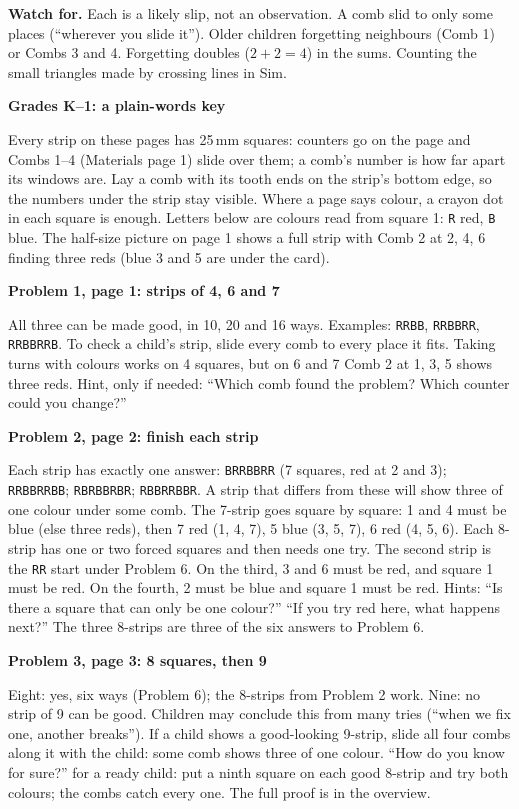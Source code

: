\documentclass[11pt]{article}
\newcommand{\head}[1]{\par\needspace{8\baselineskip}\medskip\textbf{\large #1}\par}
\newcommand{\sub}[1]{\par\needspace{4\baselineskip}\textbf{#1}\par}
\newcommand{\st}[1]{\texttt{#1}}
\begin{document}
\textbf{Watch for.} Each is a likely slip, not an observation. A comb slid to only some places (``wherever you slide it''). Older children forgetting neighbours (Comb 1) or Combs 3 and 4. Forgetting doubles ($2+2=4$) in the sums. Counting the small triangles made by crossing lines in Sim.

\head{Grades K--1: a plain-words key}
Every strip on these pages has 25\,mm squares: counters go on the page and Combs 1--4 (Materials page 1) slide over them; a comb's number is how far apart its windows are. Lay a comb with its tooth ends on the strip's bottom edge, so the numbers under the strip stay visible. Where a page says colour, a crayon dot in each square is enough. Letters below are colours read from square 1: \st{R} red, \st{B} blue. The half-size picture on page 1 shows a full strip with Comb 2 at 2, 4, 6 finding three reds (blue 3 and 5 are under the card).

\sub{Problem 1, page 1: strips of 4, 6 and 7}
All three can be made good, in 10, 20 and 16 ways. Examples: \st{RRBB}, \st{RRBBRR}, \st{RRBBRRB}. To check a child's strip, slide every comb to every place it fits. Taking turns with colours works on 4 squares, but on 6 and 7 Comb 2 at 1, 3, 5 shows three reds. Hint, only if needed: ``Which comb found the problem? Which counter could you change?''

\sub{Problem 2, page 2: finish each strip}
Each strip has exactly one answer:
\st{BRRBBRR} (7 squares, red at 2 and 3); \st{RRBBRRBB}; \st{RBRBBRBR}; \st{RBBRRBBR}. A strip that differs from these will show three of one colour under some comb. The 7-strip goes square by square: 1 and 4 must be blue (else three reds), then 7 red (1, 4, 7), 5 blue (3, 5, 7), 6 red (4, 5, 6). Each 8-strip has one or two forced squares and then needs one try. The second strip is the \st{RR} start under Problem 6. On the third, 3 and 6 must be red, and square 1 must be red. On the fourth, 2 must be blue and square 1 must be red. Hints: ``Is there a square that can only be one colour?'' ``If you try red here, what happens next?'' The three 8-strips are three of the six answers to Problem 6.

\sub{Problem 3, page 3: 8 squares, then 9}
Eight: yes, six ways (Problem 6); the 8-strips from Problem 2 work. Nine: no strip of 9 can be good. Children may conclude this from many tries (``when we fix one, another breaks''). If a child shows a good-looking 9-strip, slide all four combs along it with the child: some comb shows three of one colour. ``How do you know for sure?'' for a ready child: put a ninth square on each good 8-strip and try both colours; the combs catch every one. The full proof is in the overview.
\end{document}
